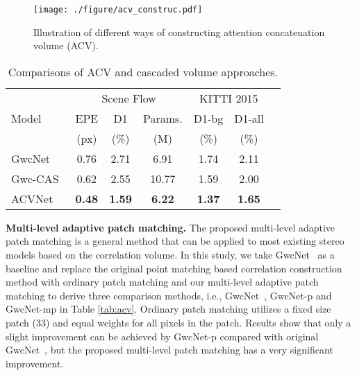 \documentclass[10pt,twocolumn,letterpaper]{article}
\begin{document}
\begin{figure*}
\centering
\texttt{[image: ./figure/acv\_construc.pdf]} \caption{Illustration of different ways of constructing attention concatenation volume (ACV).}
\label{fig:three_acv}
\vspace{-10pt}
\end{figure*} 

\begin{table} 
\begin{center}
\small
\begin{tabular}{l|ccc|ccc}
\hline
\multirow{3}{*}{Model} & \multicolumn{3}{c|}{Scene Flow} & \multicolumn{2}{c}{KITTI 2015}\\ 
 & EPE &D1 &Params. &D1-bg & D1-all\\ 
&(px) &(\%) &(M) &(\%) & (\%)\\
 
\hline
GwcNet~\cite{guo2019group} & 0.76 &2.71 &6.91 & 1.74 & 2.11\\
Gwc-CAS~\cite{gu2020cascade} & 0.62 & 2.55 &10.77 & 1.59 & 2.00 \\
ACVNet & \textbf{0.48} &\textbf{1.59} &\textbf{6.22} & \textbf{1.37} &\textbf{1.65}\\
\hline
\end{tabular}
\end{center}
\vspace{-10pt}
\caption{Comparisons of ACV and cascaded volume approaches.}\label{tab:acv_cascade}
\vspace{-15pt}
\end{table}

\textbf{Multi-level adaptive patch matching.}  The proposed multi-level adaptive patch matching is a general method that can be applied to most existing stereo models based on the correlation volume. In this study, we take GwcNet~\cite{guo2019group} as a baseline and replace the original point matching based correlation construction method with ordinary patch matching and our multi-level adaptive patch matching to derive three comparison methods, i.e., GwcNet~\cite{guo2019group}, GwcNet-p and GwcNet-mp in Table \ref{tab:acv}. Ordinary patch matching utilizes a fixed size patch (33) and equal weights for all pixels in the patch. Results show that only a slight improvement can be achieved by GwcNet-p compared with original GwcNet~\cite{guo2019group}, but the proposed multi-level patch matching has a very significant improvement.
\end{document}
